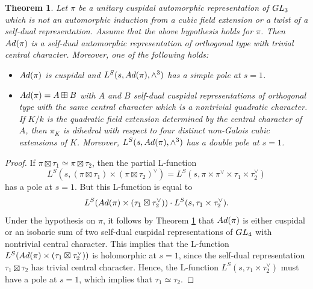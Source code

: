 \documentclass[10pt,a4paper]{amsart}
\newtheorem{thm}{Theorem}
\def\GL{{\rm GL}}
\begin{document}
\begin{thm} \label{T:cuspidality}
Let $\pi$ be a unitary cuspidal automorphic representation of $\GL_3$ which is not an automorphic induction from a cubic field extension or a twist of a self-dual representation. 
Assume that the above hypothesis holds for $\pi$. Then ${\rm Ad}(\pi)$ is a self-dual automorphic representation of orthogonal type with trivial central character. Moreover,
 one of the following holds:
\vskip 5pt
\begin{itemize}
\item[(i)]  ${\rm Ad}(\pi)$ is  cuspidal  and $L^S(s, {\rm Ad}(\pi), \wedge^3)$ has a simple pole at $s=1$.
\vskip 5pt

\item[(ii)]  ${\rm Ad}(\pi) = A \boxplus B$ with $A$ and $B$ self-dual cuspidal representations of orthogonal type with the same  central character which is a nontrivial quadratic character. If $K/k$ is the quadratic field extension determined by the central character of $A$,  then
$\pi_K$ is dihedral with respect to four distinct non-Galois cubic extensions of $K$.  Moreover, $L^S(s, {\rm Ad}(\pi), \wedge^3)$ has a double pole at $s=1$.
\end{itemize}
\end{thm}

\begin{proof}
If  $\pi \boxtimes \tau_1 \simeq \pi \boxtimes \tau_2$, then the partial L-function
\[  L^S(s,  (\pi \boxtimes \tau_1) \times (\pi \boxtimes \tau_2)^{\vee}) = L^S(s, \pi \times \pi^{\vee} \times \tau_1 \times \tau_2^{\vee}) \]
has a pole at $s=1$.  But this L-function is equal to
\[  L^S({\rm Ad}(\pi) \times (\tau_1 \boxtimes \tau_2^{\vee})) \cdot  L^S(s, \tau_1 \times \tau_2^{\vee}). \]
Under the hypothesis on $\pi$, it follows by Theorem \ref{T:cuspidality} that ${\rm Ad}(\pi)$ is either cuspidal or an isobaric sum of two self-dual cuspidal representations of $\GL_4$ with nontrivial central character.
This implies that the L-function $L^S({\rm Ad}(\pi) \times (\tau_1 \boxtimes \tau_2^{\vee}))$ is holomorphic at $s=1$, since the self-dual representation $\tau_1 \boxtimes \tau_2$ has trivial central character. 
Hence, the L-function $L^S(s, \tau_1 \times \tau_2^{\vee})$ must have a pole at $s=1$, which implies that $\tau_1 \simeq \tau_2$.
\end{proof}
\end{document}
